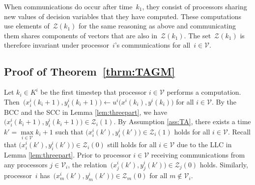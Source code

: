 \documentclass[9pt,shortpaper,twoside,web]{ieeecolor}
\newcommand{\Z}{\ensuremath{\mathcal{Z}}\xspace}
\newcommand{\V}{\ensuremath{\mathcal{V}}\xspace}
\begin{document}
    When communications do occur after time~$k_1$, they consist of processors sharing
    new values of decision variables that they have computed. These computations
    use elements of~$\Z(k_1)$ for the same reasoning as above and communicating them
    shares components of vectors that are also in~$\Z(k_1)$. 
    The set~$\Z(k_1)$ is therefore invariant under processor~$i$'s communications for all~$i \in \V$.  

    \subsection{Proof of Theorem~\ref{thrm:TAGM}} \label{app:linear}
    Let $k_i\in K^i$ be the first timestep that processor $i\in\V$ performs
    a computation. 
    Then~$\big(x^i_i(k_i+1),y^i_i(k_i+1)\big)\gets u^i\big(x^i(k_i),y^i(k_i)\big)$ for all $i \in \V$.
    By the BCC and the SCC in Lemma \ref{lem:threepart}, we have $\big(x^i_i(k_i+1),y^i_i(k_i+1)\big)\in \Z_i(1)$.
    By Assumption \ref{ass:TA}, there exists a time $k'=\max\limits_{i\in\V}k_i+1$ such that $\big(x^i_i(k'),y^i_i(k')\big)\in\Z_i(1)$ holds for all $i\in\V$.    
    Recall that $\big(x^i_i(k'),y^i_i(k')\big)\in \Z_i(0)$ still holds for all $i\in\V$ due to 
    the LLC in Lemma \ref{lem:threepart}.    
    Prior to processor $i\in\V$ receiving communications from any processors $j\in\V_i$, 
    the relation~$\big(x^i_j(k'),y^i_j(k')\big)\in\Z_j(0)$ holds.
    Similarly, processor~$i$ has~$\big(x^i_m(k'),y^i_m(k')\big)\in\Z_m(0)$
    for all $m \not\in \V_i$.
\end{document}

